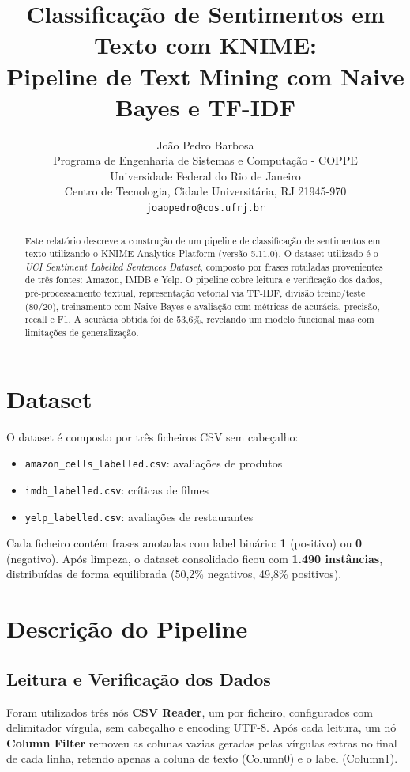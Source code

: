 \documentclass[10pt,twocolumn]{article}
\title{\textbf{Classificação de Sentimentos em Texto com KNIME:\\
Pipeline de Text Mining com Naive Bayes e TF-IDF}}
\author{
	João Pedro Barbosa \\
	Programa de Engenharia de Sistemas e Computação - COPPE\\
	Universidade Federal do Rio de Janeiro\\
	Centro de Tecnologia, Cidade Universitária, RJ 21945-970 \\
	\texttt{joaopedro@cos.ufrj.br} \\
}
\begin{document}
\maketitle

\begin{abstract}
Este relatório descreve a construção de um pipeline de classificação de sentimentos em texto utilizando o KNIME Analytics Platform (versão 5.11.0). O dataset utilizado é o \textit{UCI Sentiment Labelled Sentences Dataset}, composto por frases rotuladas provenientes de três fontes: Amazon, IMDB e Yelp. O pipeline cobre leitura e verificação dos dados, pré-processamento textual, representação vetorial via TF-IDF, divisão treino/teste (80/20), treinamento com Naive Bayes e avaliação com métricas de acurácia, precisão, recall e F1. A acurácia obtida foi de 53,6\%, revelando um modelo funcional mas com limitações de generalização.
\end{abstract}

\section{Dataset}

O dataset é composto por três ficheiros CSV sem cabeçalho:

\begin{itemize}
  \item \texttt{amazon\_cells\_labelled.csv}: avaliações de produtos
  \item \texttt{imdb\_labelled.csv}: críticas de filmes
  \item \texttt{yelp\_labelled.csv}: avaliações de restaurantes
\end{itemize}

Cada ficheiro contém frases anotadas com label binário: \textbf{1} (positivo) ou \textbf{0} (negativo). Após limpeza, o dataset consolidado ficou com \textbf{1.490 instâncias}, distribuídas de forma equilibrada (50,2\% negativos, 49,8\% positivos).

\section{Descrição do Pipeline}

\subsection{Leitura e Verificação dos Dados}

Foram utilizados três nós \textbf{CSV Reader}, um por ficheiro, configurados com delimitador vírgula, sem cabeçalho e encoding UTF-8. Após cada leitura, um nó \textbf{Column Filter} removeu as colunas vazias geradas pelas vírgulas extras no final de cada linha, retendo apenas a coluna de texto (Column0) e o label (Column1).
\end{document}
